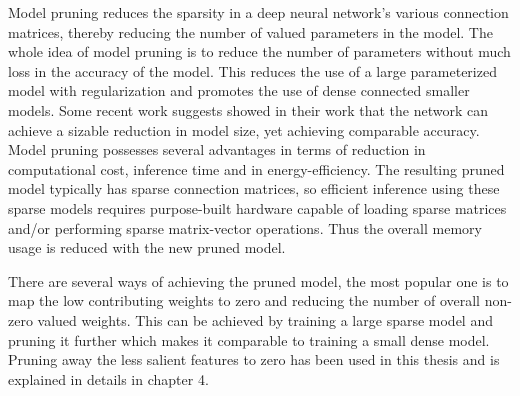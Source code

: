 Model pruning reduces the sparsity in a deep neural network's
various connection matrices, thereby reducing the number of valued parameters in the model. The whole idea of model pruning is to reduce the number of parameters without much loss in the accuracy of the model. This reduces the use of a large parameterized model with regularization and promotes the use of dense connected smaller models. Some recent work suggests \cite{DBLP:journals/corr/HanMD15} \cite{DBLP:journals/corr/NarangDSE17} showed in their work that the network can achieve a sizable reduction in model size, yet achieving comparable accuracy. 
Model pruning possesses several advantages in terms of reduction in computational cost, inference time and in energy-efficiency. The resulting pruned model typically has sparse connection matrices, so
efficient inference using these sparse models requires purpose-built hardware capable of loading sparse matrices and/or performing sparse matrix-vector operations. Thus the overall memory usage is reduced with the new pruned model. 


There are several ways of achieving the pruned model, the most popular one is to map the low contributing weights to zero and reducing the number of overall non-zero valued weights. This can be achieved by training a large sparse model and pruning it further which makes it comparable to training a small dense model. Pruning away the less salient features to zero has been used in this thesis and is explained in details in chapter 4. 


